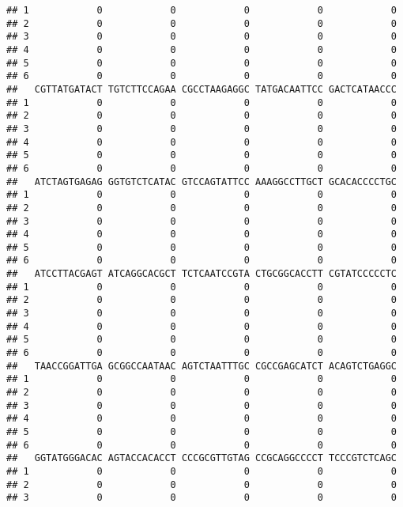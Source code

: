 \documentclass[]{article}
\begin{document}
\begin{verbatim}
## 1            0            0            0            0            0
## 2            0            0            0            0            0
## 3            0            0            0            0            0
## 4            0            0            0            0            0
## 5            0            0            0            0            0
## 6            0            0            0            0            0
##   CGTTATGATACT TGTCTTCCAGAA CGCCTAAGAGGC TATGACAATTCC GACTCATAACCC
## 1            0            0            0            0            0
## 2            0            0            0            0            0
## 3            0            0            0            0            0
## 4            0            0            0            0            0
## 5            0            0            0            0            0
## 6            0            0            0            0            0
##   ATCTAGTGAGAG GGTGTCTCATAC GTCCAGTATTCC AAAGGCCTTGCT GCACACCCCTGC
## 1            0            0            0            0            0
## 2            0            0            0            0            0
## 3            0            0            0            0            0
## 4            0            0            0            0            0
## 5            0            0            0            0            0
## 6            0            0            0            0            0
##   ATCCTTACGAGT ATCAGGCACGCT TCTCAATCCGTA CTGCGGCACCTT CGTATCCCCCTC
## 1            0            0            0            0            0
## 2            0            0            0            0            0
## 3            0            0            0            0            0
## 4            0            0            0            0            0
## 5            0            0            0            0            0
## 6            0            0            0            0            0
##   TAACCGGATTGA GCGGCCAATAAC AGTCTAATTTGC CGCCGAGCATCT ACAGTCTGAGGC
## 1            0            0            0            0            0
## 2            0            0            0            0            0
## 3            0            0            0            0            0
## 4            0            0            0            0            0
## 5            0            0            0            0            0
## 6            0            0            0            0            0
##   GGTATGGGACAC AGTACCACACCT CCCGCGTTGTAG CCGCAGGCCCCT TCCCGTCTCAGC
## 1            0            0            0            0            0
## 2            0            0            0            0            0
## 3            0            0            0            0            0

\end{verbatim}
\end{document}

